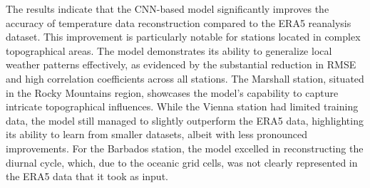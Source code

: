 The results indicate that the CNN-based model significantly improves the accuracy of temperature data reconstruction compared to the ERA5 reanalysis dataset. This improvement is particularly notable for stations located in complex topographical areas.
The model demonstrates its ability to generalize local weather patterns effectively, as evidenced by the substantial reduction in RMSE and high correlation coefficients across all stations. The Marshall station, situated in the Rocky Mountains region, showcases the model's capability to capture intricate topographical influences.
While the Vienna station had limited training data, the model still managed to slightly outperform the ERA5 data, highlighting its ability to learn from smaller datasets, albeit with less pronounced improvements.
For the Barbados station, the model excelled in reconstructing the diurnal cycle, which, due to the oceanic grid cells, was not clearly represented in the ERA5 data that it took as input.